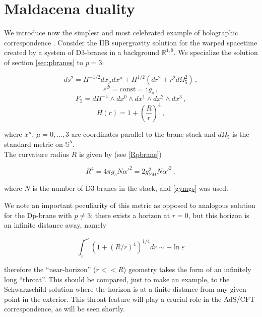 \section{Maldacena duality}

We introduce now the simplest and most celebrated example of holographic correspondence \cite{Maldacena}. Consider the IIB supergravity solution for the warped spacetime created by a system of D3-branes in a background $\mathbb{R}^{1,9}$. We specialize the solution of section \ref{sec:pbranes} to $p=3$:

\begin{equation}
	ds^2 = H^{-1/2} dx_\mu dx^\mu + H^{1/2} (dr^2 + r^2 d\Omega^2_5)\label{black3metric}\,,
\end{equation}
\begin{equation}
	e^\Phi = \mathrm{const} =: g_s\,,
\end{equation}
\begin{equation}\label{threebraneF5}
	F_5 = dH^{-1} \wedge dx^0 \wedge dx^1 \wedge dx^2 \wedge dx^3\,,
\end{equation}
\begin{equation}
	H(r) = 1 + \left( \frac{R}{r} \right)^4\,,
	\label{}
\end{equation}

where $x^\mu$, $\mu = 0,\ldots,3$ are coordinates parallel to the brane stack and $d\Omega_5$ is the standard metric on $\mathbb{S}^5$.\\

The curvature radius $R$ is given by (see \eqref{Rpbrane})

\begin{equation}
	R^4 = 4\pi g_s N \alpha'^2 = 2 g_{YM}^2 N \alpha'^2\,,
	\label{}
\end{equation}

where $N$ is the number of D3-branes in the stack, and \eqref{gymgs} was used.

We note an important peculiarity of this metric as opposed to analogous solution for the Dp-brane with $p\neq 3$: there exists a horizon at $r=0$, but this horizon is an infinite distance away, namely

\begin{equation}
	\int_\varepsilon^{r'} \left( 1 + \left( R/r \right)^4 \right)^{1/4} dr \sim -\ln\varepsilon
	\label{}
\end{equation}

therefore the ``near-horizon'' ($r<<R$) geometry takes the form of an infinitely long ``throat''. This should be compared, just to make an example, to the Schwarzschild solution where the horizon is at a finite distance from any given point in the exterior. This throat feature will play a crucial role in the AdS/CFT correspondence, as will be seen shortly.

